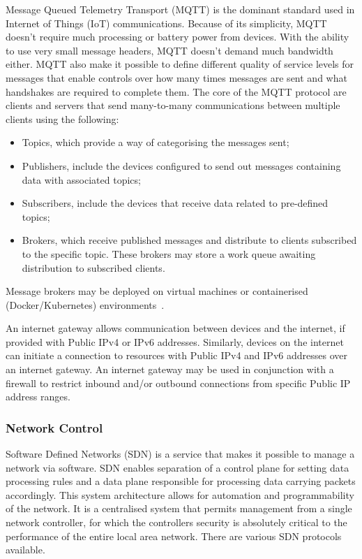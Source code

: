 \documentclass[11pt, oneside]{book}   	%
\begin{document}
Message Queued Telemetry Transport (MQTT) is the dominant standard used in Internet of Things (IoT) communications.
Because of its simplicity, MQTT doesn’t require much processing or battery power from devices.
With the ability to use very small message headers, MQTT doesn’t demand much bandwidth either.
MQTT also make it possible to define different quality of service levels for messages that enable controls over how many times messages are sent and what handshakes are required to complete them.
The core of the MQTT protocol are clients and servers that send many-to-many communications between multiple clients using the following:
\begin{itemize}
	\item Topics, which provide a way of categorising the messages sent; 
	\item Publishers, include the devices configured to send out messages containing data with associated topics;
	\item Subscribers, include the devices that receive data related to pre-defined topics;
	\item Brokers, which receive published messages and distribute to clients subscribed to the specific topic. These brokers may store a work queue awaiting distribution to subscribed clients.
\end{itemize}
Message brokers may be deployed on virtual machines or containerised (Docker/Kubernetes) environments~\cite{mqtt}.\

An internet gateway allows communication between devices and the internet, if provided with Public IPv4 or IPv6 addresses.
Similarly, devices on the internet can initiate a connection to resources with Public IPv4 and IPv6 addresses over an internet gateway.
An internet gateway may be used in conjunction with a firewall to restrict inbound and/or outbound connections from specific Public IP address ranges.\

\subsubsection{Network Control}
Software Defined Networks (SDN) is a service that makes it possible to manage a network via software.
SDN enables separation of a control plane for setting data processing rules and a data plane responsible for processing data carrying packets accordingly.
This system architecture allows for automation and programmability of the network.
It is a centralised system that permits management from a single network controller, for which the controllers security is absolutely critical to the performance of the entire local area network.
There are various SDN protocols available.\
\end{document}
